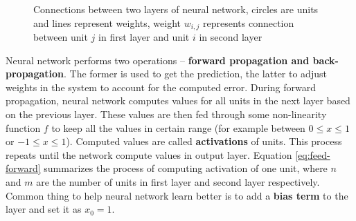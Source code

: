     \begin{figure}
        \centering
        \caption[Connections between two layers of neural network]{Connections between two layers of neural network, circles are units and lines represent weights, weight $w_{i, j}$ represents connection between unit $j$ in first layer and unit $i$ in second layer}
        \label{fig:neural_network}
    \end{figure}
    Neural network performs two operations -- \textbf{forward propagation and back-propagation}. The former is used to get the prediction, the latter to adjust weights in the system to account for the computed error. During forward propagation, neural network computes values for all units in the next layer based on the previous layer. These values are then fed through some non-linearity function $f$ to keep all the values in certain range (for example between $0 \leq x \leq 1$ or $-1 \leq x \leq 1$). Computed values are called \textbf{activations} of units. This process repeats until the network compute values in output layer. Equation \ref{eq:feed-forward} summarizes the process of computing activation of one unit, where $n$ and $m$ are the number of units in first layer and second layer respectively. Common thing to help neural network learn better is to add a \textbf{bias term} to the layer and set it as $x_0 = 1$.
